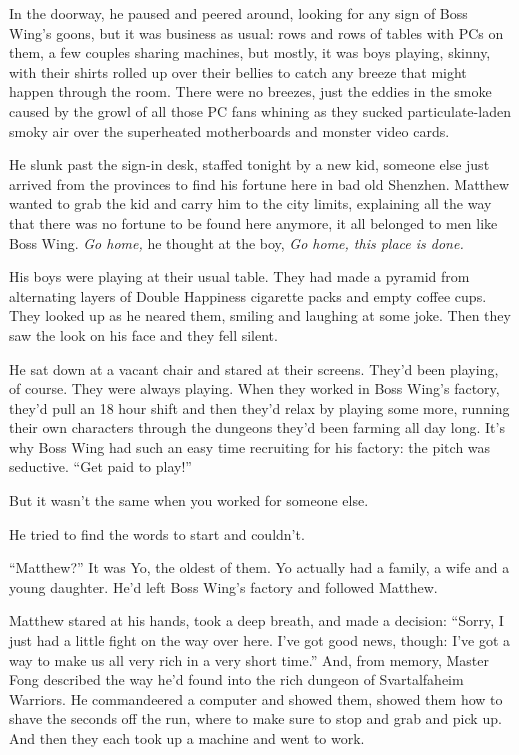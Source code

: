 In the doorway, he paused and peered around, looking for any sign
of Boss Wing's goons, but it was business as usual: rows and rows
of tables with PCs on them, a few couples sharing machines, but
mostly, it was boys playing, skinny, with their shirts rolled up
over their bellies to catch any breeze that might happen through
the room. There were no breezes, just the eddies in the smoke
caused by the growl of all those PC fans whining as they sucked
particulate-laden smoky air over the superheated motherboards and
monster video cards.

He slunk past the sign-in desk, staffed tonight by a new kid,
someone else just arrived from the provinces to find his fortune
here in bad old Shenzhen. Matthew wanted to grab the kid and carry
him to the city limits, explaining all the way that there was no
fortune to be found here anymore, it all belonged to men like Boss
Wing. \emph{Go home,} he thought at the boy,
\emph{Go home, this place is done.}

His boys were playing at their usual table. They had made a pyramid
from alternating layers of Double Happiness cigarette packs and
empty coffee cups. They looked up as he neared them, smiling and
laughing at some joke. Then they saw the look on his face and they
fell silent.

He sat down at a vacant chair and stared at their screens. They'd
been playing, of course. They were always playing. When they worked
in Boss Wing's factory, they'd pull an 18 hour shift and then
they'd relax by playing some more, running their own characters
through the dungeons they'd been farming all day long. It's why
Boss Wing had such an easy time recruiting for his factory: the
pitch was seductive. ``Get paid to play!''

But it wasn't the same when you worked for someone else.

He tried to find the words to start and couldn't.

``Matthew?'' It was Yo, the oldest of them. Yo actually had a family,
a wife and a young daughter. He'd left Boss Wing's factory and
followed Matthew.

Matthew stared at his hands, took a deep breath, and made a
decision: ``Sorry, I just had a little fight on the way over here.
I've got good news, though: I've got a way to make us all very rich
in a very short time.'' And, from memory, Master Fong described the
way he'd found into the rich dungeon of Svartalfaheim Warriors. He
commandeered a computer and showed them, showed them how to shave
the seconds off the run, where to make sure to stop and grab and
pick up. And then they each took up a machine and went to work.

